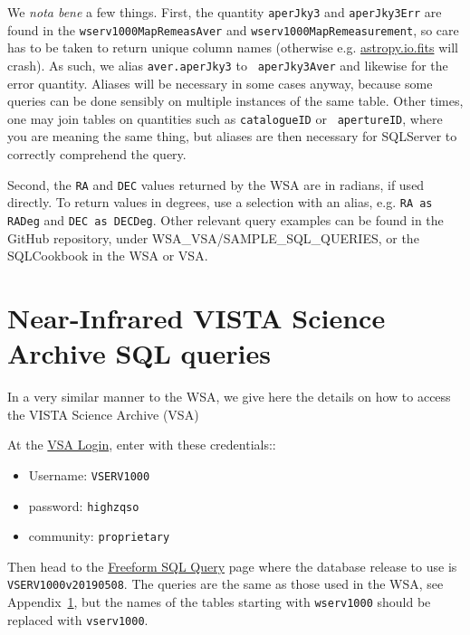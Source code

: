 \documentclass[usenatbib]{mnras}
\begin{document}
We {\it nota bene} a few things. First, the quantity {\tt aperJky3}
and {\tt aperJky3Err} are found in the {\tt wserv1000MapRemeasAver}
and {\tt wserv1000MapRemeasurement}, so care has to be taken to return
unique column names (otherwise e.g.
\href{http://docs.astropy.org/en/stable/io/fits/}{astropy.io.fits}
will crash).  As such, we alias {\tt aver.aperJky3} to {\tt
aperJky3Aver} and likewise for the error quantity. Aliases will be
necessary in some cases anyway, because some queries can be done
sensibly on multiple instances of the same table. Other times, one may
join tables on quantities such as {\tt catalogueID} or {\tt
apertureID}, where you are meaning the same thing, but aliases are then necessary 
for SQLServer to correctly comprehend the query. 

Second, the {\tt RA} and {\tt DEC} values returned by the WSA are in radians, if
used directly. To return values in degrees, use a selection with an alias, e.g. 
{\tt RA as RADeg} and {\tt DEC as DECDeg}. Other relevant query examples can be found in the
GitHub repository, under WSA\_VSA/SAMPLE\_SQL\_QUERIES, or the SQLCookbook in the WSA or VSA.

\onecolumn

\twocolumn


\section{Near-Infrared VISTA Science Archive SQL queries}\label{sec:SQL}
In a very similar manner to the WSA, we give here the details on how to access
the VISTA Science Archive (VSA)

At the \href{http://horus.roe.ac.uk/vsa/login.html}{VSA Login}, enter 
with these credentials::
\begin{itemize}
    \item Username: {\tt VSERV1000} 
    \item password: {\tt highzqso} 
    \item community: {\tt proprietary}
\end{itemize}
Then head to the \href{http://horus.roe.ac.uk:8080/vdfs/VSQL_form.jsp}{Freeform SQL Query} page where the database release to use is {\tt VSERV1000v20190508}. The queries are the same as those used in the WSA, see Appendix~\ref{sec:SQL}, but the names of the tables starting with {\tt wserv1000} should be replaced with {\tt vserv1000}.

%






%
%


\end{document}
